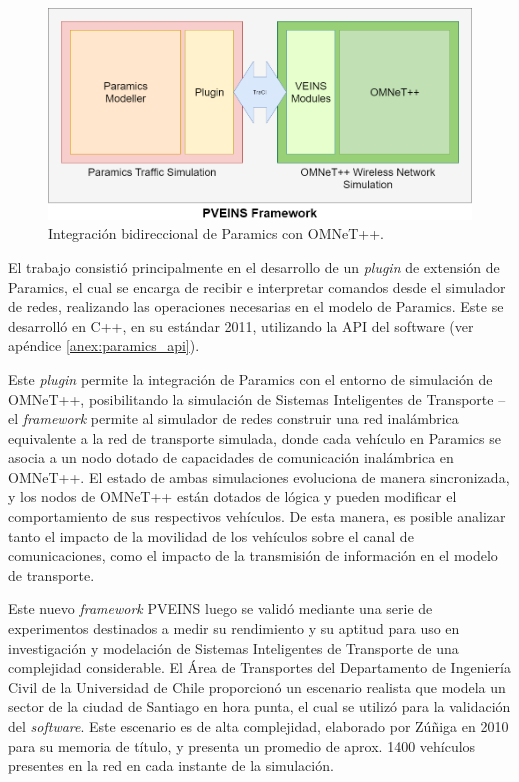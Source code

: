 \begin{figure}[tpb]
    \centering
    \includegraphics[width=\linewidth]{figuras/PVEINSArch.png}
    \caption{Integración bidireccional de Paramics con OMNeT++.}
    \label{fig:pveins_genarch:resumen}
\end{figure}

El trabajo consistió principalmente en el desarrollo de un \emph{plugin} de extensión de Paramics, el cual se encarga de recibir e interpretar comandos desde el simulador de redes, realizando las operaciones necesarias en el modelo de Paramics. Este se desarrolló en C++, en su estándar 2011, utilizando la API del software (ver apéndice \ref{anex:paramics_api}).

Este \emph{plugin} permite la integración de Paramics con el entorno de simulación de OMNeT++, posibilitando la simulación de Sistemas Inteligentes de Transporte -- el \emph{framework} permite al simulador de redes construir una red inalámbrica equivalente a la red de transporte simulada, donde cada vehículo en Paramics se asocia a un nodo dotado de capacidades de comunicación inalámbrica en OMNeT++. El estado de ambas simulaciones evoluciona de manera sincronizada, y los nodos de OMNeT++ están dotados de lógica y pueden modificar el comportamiento de sus respectivos vehículos. De esta manera, es posible analizar tanto el impacto de la movilidad de los vehículos sobre el canal de comunicaciones, como el impacto de la transmisión de información en el modelo de transporte.

Este nuevo \emph{framework} PVEINS luego se validó mediante una serie de experimentos destinados a medir su rendimiento y su aptitud para uso en investigación y modelación de Sistemas Inteligentes de Transporte de una complejidad considerable. El Área de Transportes del Departamento de Ingeniería Civil de la Universidad de Chile proporcionó un escenario realista que modela un sector de la ciudad de Santiago en hora punta, el cual se utilizó para la validación del \emph{software}. Este escenario es de alta complejidad, elaborado por Zúñiga \autocite{zuniga} en 2010 para su memoria de título, y presenta un promedio de aprox. 1400 vehículos presentes en la red en cada instante de la simulación. 


